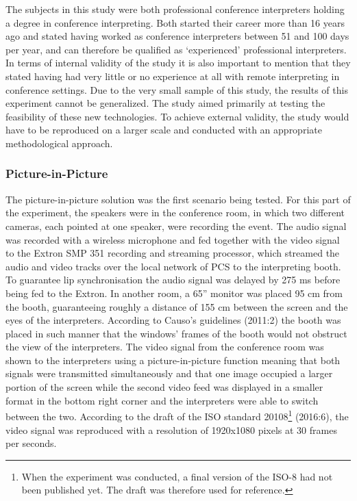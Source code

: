 \documentclass[output=paper]{langsci/langscibook}
\begin{document}
The subjects in this study were both professional conference interpreters holding a degree in conference interpreting. Both started their career more than 16 years ago and stated having worked as conference interpreters between 51 and 100 days per year, and can therefore be qualified as ‘experienced’ professional interpreters. In terms of internal validity of the study it is also important to mention that they stated having had very little or no experience at all with remote interpreting in conference settings. Due to the very small sample of this study, the results of this experiment cannot be generalized. The study aimed primarily at testing the feasibility of these new technologies. To achieve external validity, the study would have to be reproduced on a larger scale and conducted with an appropriate methodological approach.

\subsubsection{Picture-in-Picture} 

The picture-in-picture solution was the first scenario being tested. For this part of the experiment, the speakers were in the conference room, in which two different cameras, each pointed at one speaker, were recording the event. The audio signal was recorded with a wireless microphone and fed together with the video signal to the Extron SMP 351 recording and streaming processor, which streamed the audio and video tracks over the local network of PCS to the interpreting booth. To guarantee lip synchronisation the audio signal was delayed by 275 ms before being fed to the Extron. In another room, a 65” monitor was placed 95 cm from the booth, guaranteeing roughly a distance of 155 cm between the screen and the eyes of the interpreters. According to Causo’s guidelines (2011:2) the booth was placed in such manner that the windows’ frames of the booth would not obstruct the view of the interpreters. The video signal from the conference room was shown to the interpreters using a picture-in-picture function meaning that both signals were transmitted simultaneously and that one image occupied a larger portion of the screen while the second video feed was displayed in a smaller format in the bottom right corner and the interpreters were able to switch between the two. According to the draft of the ISO standard 20108\footnote{When the experiment was conducted, a final version of the ISO-\citealt{Norm2010}8 had not been published yet. The draft was therefore used for reference.} (2016:6), the video signal was reproduced with a resolution of 1920x1080 pixels at 30 frames per seconds. 
\end{document}
